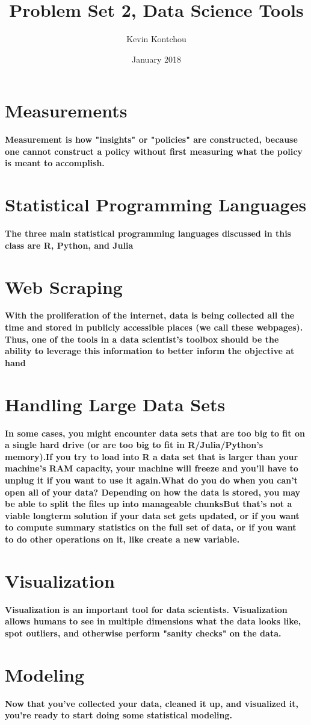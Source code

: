 \documentclass{article}
\title{Problem Set 2, Data Science Tools}
\author{Kevin Kontchou }
\date{January 2018}
\begin{document}

\section{Measurements}
\textbf{Measurement is how "insights" or "policies" are constructed, because one cannot construct a policy without first measuring what the policy is meant to accomplish.}

\section{Statistical Programming Languages}
\textbf{The three main statistical programming languages discussed in this class are R, Python, and Julia}

\section{Web Scraping}
\textbf{With the proliferation of the internet, data is being collected all the time and stored in publicly accessible places (we call these webpages). Thus, one of the tools in a data scientist's toolbox should be the ability to leverage this information to better inform the objective at hand}

\section{Handling Large Data Sets}
\textbf{In some cases, you might encounter data sets that are too big to fit on a single hard drive (or are too big to fit in R/Julia/Python's memory).If you try to load into R a data set that is larger than your machine's RAM capacity, your machine will freeze and you'll have to unplug it if you want to use it again.What do you do when you can't open all of your data? Depending on how the data is stored, you may be able to split the files up into manageable chunksBut that's not a viable longterm solution if your data set gets updated, or if you want to compute summary statistics on the full set of data, or if you want to do other operations on it, like create a new variable.}

\section{Visualization}
\textbf{Visualization is an important tool for data scientists. Visualization allows humans to see in multiple dimensions what the data looks like, spot outliers, and otherwise perform "sanity checks" on the data.}

\section{Modeling}
\textbf{Now that you've collected your data, cleaned it up, and visualized it, you're ready to start doing some statistical modeling.}
\end{document}
